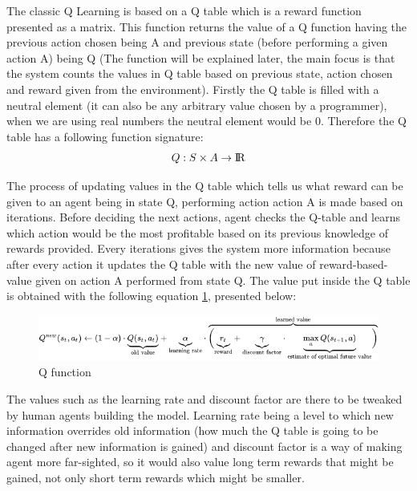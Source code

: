 \documentclass[]{article}
\begin{document}
\par The classic Q Learning is based on a Q table which is a reward function presented as a matrix. This function returns the value of a Q function having the previous action chosen being A and previous state (before performing a given action A) being Q (The function will be explained later, the main focus is that the system counts the values in Q table based on previous state, action chosen and reward given from the environment). Firstly the Q table is filled with a neutral element (it can also be any arbitrary value chosen by a programmer), when we are using real numbers the neutral element would be 0. Therefore the Q table has a following function signature: 
\begin{equation}
Q : S \times A \rightarrow \rm I\!R
\end{equation}

\par The process of updating values in the Q table which tells us what reward can be given to an agent being in state Q, performing action action A is made based on iterations. Before deciding the next actions, agent checks the Q-table and learns which action would be the most profitable based on its previous knowledge of rewards provided. Every iterations gives the system more information because after every action it updates the Q table with the new value of reward-based-value given on action A performed from state Q. The value put inside the Q table is obtained with the following equation \ref{fig:qlearn}, presented below: 

\begin{figure}[h]
	\centering
	\includegraphics[scale=0.4]{qlearn}
	\caption{Q function}
	\label{fig:qlearn}
\end{figure}

\par The values such as the learning rate and discount factor are there to be tweaked by human agents building the model. Learning rate being a level to which new information overrides old information (how much the Q table is going to be changed after new information is gained) and discount factor is a way of making agent more far-sighted, so it would also value long term rewards that might be gained, not only short term rewards which might be smaller. 
\end{document}

